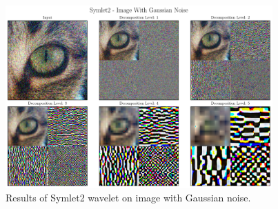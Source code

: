 \documentclass[12pt]{article}
\begin{document}
	\begin{figure}[!h]
		\centering
		\includegraphics[height=7cm]{../Tests/Outputs/2D_Symlet2Wavelet_GaussianNoise.pdf}
		\caption{Results of Symlet2 wavelet on image with Gaussian noise.}
		\label{fig:2d_sym2_gs}
	\end{figure}
	\clearpage
\end{document}
